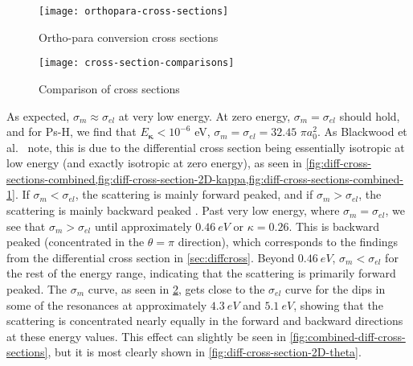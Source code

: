 \documentclass[Dissertation.tex]{subfiles}
\begin{document}

\begin{figure}[H]
	\centering
	\texttt{[image: orthopara-cross-sections]}
	\caption{Ortho-para conversion cross sections}
	\label{fig:orthopara-cross-sections}
\end{figure}

\begin{figure}[H]
	\centering
	\texttt{[image: cross-section-comparisons]}
	\caption{Comparison of cross sections}
	\label{fig:cross-section-comparisons}
\end{figure}

As expected, $\sigma_m \approx \sigma_{el}$ at very low energy. 
At zero energy, $\sigma_m = \sigma_{el}$ should hold, and for Ps-H, we find that
$E_{\bm \kappa} < 10^{-6}$ eV, $\sigma_m = \sigma_{el} = 32.45$ $\pi a_0^2$. 
As Blackwood et al.\ \cite{Blackwood2002c} note, this is due to the differential
cross section being essentially isotropic at low energy (and exactly isotropic at
zero energy), as seen in
\cref{fig:diff-cross-sections-combined,fig:diff-cross-section-2D-kappa,fig:diff-cross-sections-combined-1}.
If $\sigma_m < \sigma_{el}$, the scattering is mainly forward peaked, and if
$\sigma_m > \sigma_{el}$, the scattering is mainly backward peaked \cite{Thumm1993}.
Past very low energy, where $\sigma_m = \sigma_{el}$, we see that $\sigma_m > \sigma_{el}$
until approximately $\SI{0.46}{eV}$ or $\kappa = 0.26$. This is backward peaked
(concentrated in the $\theta = \pi$ direction), which corresponds to the
findings from the differential cross section in \cref{sec:diffcross}. Beyond
$\SI{0.46}{eV}$, $\sigma_m < \sigma_{el}$ for the rest of the energy range,
indicating that the scattering is primarily forward peaked. The $\sigma_m$ curve,
as seen in \cref{fig:cross-section-comparisons}, gets close to the $\sigma_{el}$
curve for the dips in some of the resonances at approximately $\SI{4.3}{eV}$
and $\SI{5.1}{eV}$, showing that the scattering is concentrated nearly equally
in the forward and backward directions at these energy values.
This effect can slightly be seen in \cref{fig:combined-diff-cross-sections},
but it is most clearly shown in \cref{fig:diff-cross-section-2D-theta}.









\biblio
\end{document}
